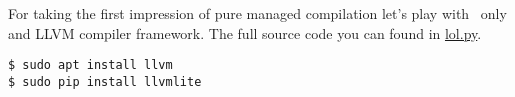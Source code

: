 \clearpage{}\label{llvmpy}

For taking the first impression of pure managed compilation let's play with
\py\ only and LLVM compiler framework. The full source code you can found in
\href{https://github.com/ponyatov/o/blob/master/lol.py}{lol.py}.

\begin{lstlisting}
$ sudo apt install llvm
$ sudo pip install llvmlite
\end{lstlisting}
